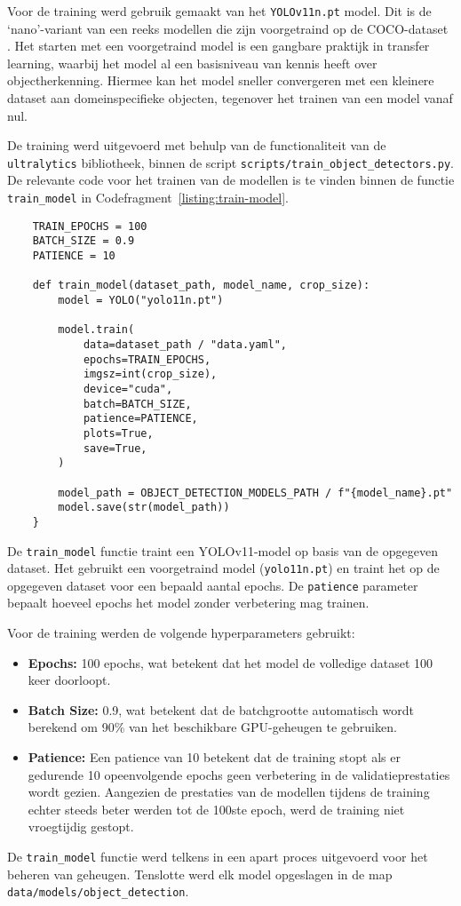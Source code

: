 Voor de training werd gebruik gemaakt van het \texttt{YOLOv11n.pt} model. 
Dit is de `nano'-variant van een reeks modellen die zijn voorgetraind op de COCO-dataset \autocite{Khanam2024}.
Het starten met een voorgetraind model is een gangbare praktijk in transfer learning, waarbij het model 
al een basisniveau van kennis heeft over objectherkenning.
Hiermee kan het model sneller convergeren met een kleinere dataset aan domeinspecifieke objecten, tegenover het trainen van een model vanaf nul.

De training werd uitgevoerd met behulp van de functionaliteit van de \texttt{ultralytics} bibliotheek, 
binnen de script \texttt{scripts/train\_object\_detectors.py}.
De relevante code voor het trainen van de modellen is te vinden binnen de functie \texttt{train\_model} in Codefragment~\ref{listing:train-model}.

\begin{listing}[H]
  \begin{verbatim}
    TRAIN_EPOCHS = 100
    BATCH_SIZE = 0.9
    PATIENCE = 10

    def train_model(dataset_path, model_name, crop_size):
        model = YOLO("yolo11n.pt")

        model.train(
            data=dataset_path / "data.yaml",
            epochs=TRAIN_EPOCHS,
            imgsz=int(crop_size),
            device="cuda",
            batch=BATCH_SIZE,
            patience=PATIENCE,
            plots=True,
            save=True,
        )

        model_path = OBJECT_DETECTION_MODELS_PATH / f"{model_name}.pt"
        model.save(str(model_path))
    }
  \end{verbatim}
  \caption[Functie voor het trainen van YOLOv11-modellen]{
    \label{listing:train-model}
    De \texttt{train\_model} functie traint een YOLOv11-model op basis van de opgegeven dataset.
    Het gebruikt een voorgetraind model (\texttt{yolo11n.pt}) en traint het op de opgegeven dataset voor een bepaald aantal epochs.
    De \texttt{patience} parameter bepaalt hoeveel epochs het model zonder verbetering mag trainen.
  }
\end{listing}

Voor de training werden de volgende hyperparameters gebruikt:
\begin{itemize}
    \item \textbf{Epochs:} 100 epochs, wat betekent dat het model de volledige dataset 100 keer doorloopt.
    \item \textbf{Batch Size:} 0.9, wat betekent dat de batchgrootte automatisch wordt berekend om 90\% van het beschikbare GPU-geheugen te gebruiken. 
    \item \textbf{Patience:} Een patience van 10 betekent dat de training stopt als er gedurende 10 opeenvolgende epochs geen verbetering in de validatieprestaties wordt gezien.
    Aangezien de prestaties van de modellen tijdens de training echter steeds beter werden tot de 100ste epoch, werd de training niet vroegtijdig gestopt.
\end{itemize}
De \texttt{train\_model} functie werd telkens in een apart proces uitgevoerd voor het beheren van geheugen.
Tenslotte werd elk model opgeslagen in de map \texttt{data/models/object\_detection}.


